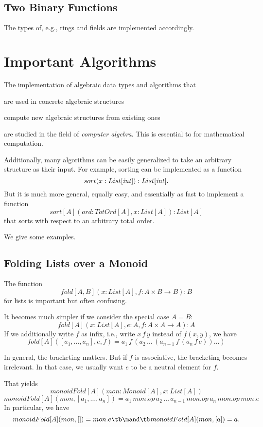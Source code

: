 \subsection{Two Binary Functions}

The types of, e.g., rings and fields are implemented accordingly.

\section{Important Algorithms}

The implementation of algebraic data types and algorithms that
\begin{compactitem}
 \item are used in concrete algebraic structures
 \item compute new algebraic structures from existing ones
\end{compactitem}
are studied in the field of \emph{computer algebra}.
This is essential to for mathematical computation.
\medskip

Additionally, many algorithms can be easily generalized to take an arbitrary structure as their input.
For example, sorting can be implemented as a function \[sort(x:List[\mathit{int}]):List[\mathit{int}].\]
But it is much more general, equally easy, and essentially as fast to implement a function \[sort[A](ord: TotOrd[A], x:List[A]):List[A]\] that sorts with respect to an arbitrary total order.

We give some examples.

\subsection{Folding Lists over a Monoid}\label{sec:ad:monoidfold}

The function \[fold[A,B](x:List[A], f: A\times B\to B): B\] for lists is important but often confusing.

It becomes much simpler if we consider the special case $A=B$:
\[fold[A](x:List[A], e: A, f: A\times A\to A): A\]
If we additionally write $f$ as infix, i.e., write $x\,f\,y$ instead of $f(x,y)$, we have
\[fold[A]([a_1,\ldots,a_n],e,f)=a_1\,f\,(a_2\,\ldots\,(a_{n-1}\,f\,(a_n\,f\, e))\ldots)\]

In general, the bracketing matters.
But if $f$ is associative, the bracketing becomes irrelevant.
In that case, we usually want $e$ to be a neutral element for $f$.

That yields
\[monoidFold[A](mon:Monoid[A], x:List[A])\]
\[monoidFold[A](mon, [a_1,\ldots,a_n])=a_1\,mon.op\,a_2\,\ldots\,a_{n-1}\,mon.op\,a_n\,mon.op\, mon.e\]
In particular, we have
\[monoidFold[A](mon, [])=mon.e \tb\mand\tb monoidFold[A](mon, [a])=a.\]

